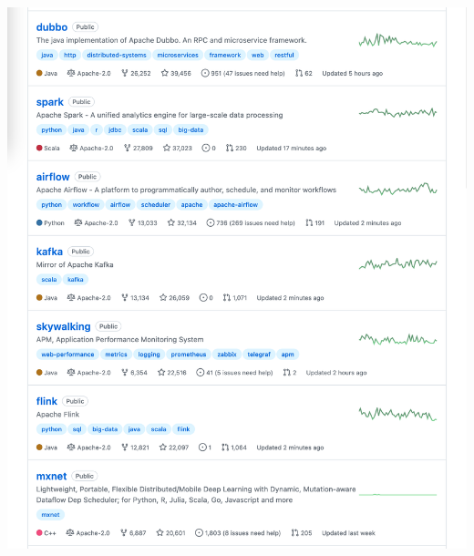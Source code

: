 \Continuing
\begin{center}
    \includegraphics[width=40em]{beam-github-stars-dropdown-p2}
\end{center}
\WillContinue
\pagebreak

